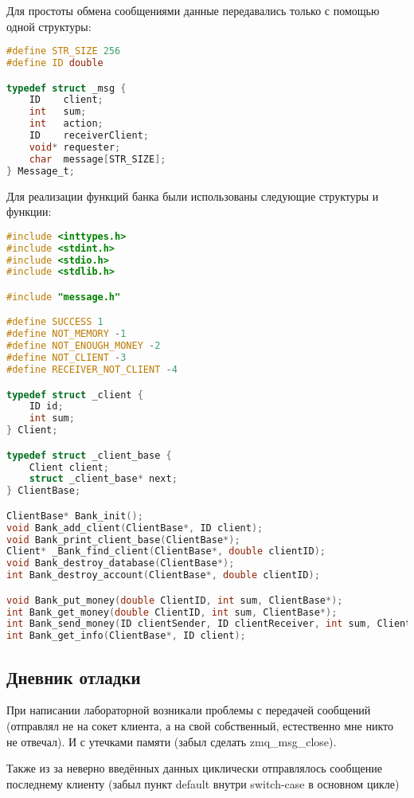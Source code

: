 \documentclass[12pt]{article}
\begin{document}
\noindent Для простоты обмена сообщениями данные передавались только с помощью одной структуры:

{ \scriptsize
\begin{lstlisting}[language=c]
#define STR_SIZE 256
#define ID double

typedef struct _msg {
    ID    client;
    int   sum;
    int   action;
    ID    receiverClient;
    void* requester;
    char  message[STR_SIZE];
} Message_t;

\end{lstlisting}
}

\noindent Для реализации функций банка были использованы следующие структуры и функции: 
{ \scriptsize
\begin{lstlisting}[language=c]
#include <inttypes.h>
#include <stdint.h>
#include <stdio.h>
#include <stdlib.h>

#include "message.h"

#define SUCCESS 1
#define NOT_MEMORY -1
#define NOT_ENOUGH_MONEY -2
#define NOT_CLIENT -3
#define RECEIVER_NOT_CLIENT -4

typedef struct _client {
    ID id;
    int sum;
} Client;

typedef struct _client_base {
    Client client;
    struct _client_base* next;
} ClientBase;

ClientBase* Bank_init();
void Bank_add_client(ClientBase*, ID client);
void Bank_print_client_base(ClientBase*);
Client* _Bank_find_client(ClientBase*, double clientID);
void Bank_destroy_database(ClientBase*);
int Bank_destroy_account(ClientBase*, double clientID);

void Bank_put_money(double ClientID, int sum, ClientBase*);
int Bank_get_money(double ClientID, int sum, ClientBase*);
int Bank_send_money(ID clientSender, ID clientReceiver, int sum, ClientBase*);
int Bank_get_info(ClientBase*, ID client);
\end{lstlisting}
}
\newpage
\subsection*{Дневник отладки}

При написании лабораторной возникали проблемы с передачей сообщений (отправлял не на сокет клиента, а на свой собственный, естественно мне никто не отвечал). И с утечками памяти (забыл сделать zmq\_msg\_close).

 Также из за неверно введённых данных циклически отправлялось сообщение последнему клиенту (забыл пункт default внутри switch-case в основном цикле)
\end{document}
